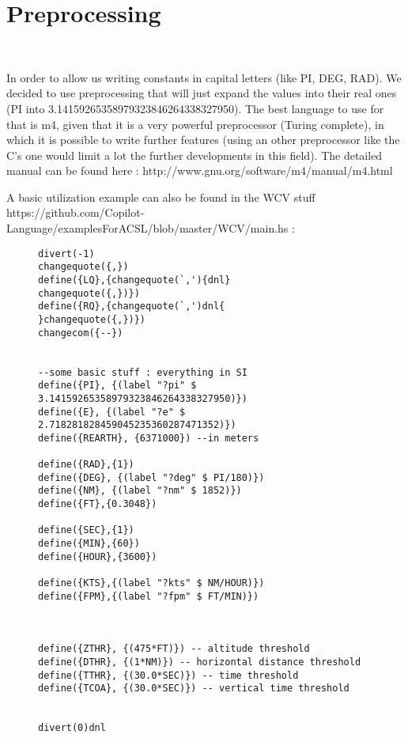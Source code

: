 \section{Preprocessing}~\label{sec:preprocessing}

In order to allow us writing constants in capital letters (like PI, DEG, RAD). We decided to use preprocessing that will just expand the values into their real ones (PI into 3.14159265358979323846264338327950). The best language to use for that is m4, given that it is a very powerful preprocessor (Turing complete), in which it is possible to write further features (using an other preprocessor like the C's one would limit a lot the further developments in this field). The detailed manual can be found here : http://www.gnu.org/software/m4/manual/m4.html


A basic utilization example can also be found in the WCV stuff https://github.com/Copilot-Language/examplesForACSL/blob/master/WCV/main.hs : 

\begin{figure}[!htb]
\begin{lstlisting}
divert(-1)
changequote({,})
define({LQ},{changequote(`,'){dnl}
changequote({,})})
define({RQ},{changequote(`,')dnl{
}changequote({,})})
changecom({--})


--some basic stuff : everything in SI
define({PI}, {(label "?pi" $ 3.14159265358979323846264338327950)})
define({E}, {(label "?e" $ 2.718281828459045235360287471352)})
define({REARTH}, {6371000}) --in meters

define({RAD},{1})
define({DEG}, {(label "?deg" $ PI/180)})
define({NM}, {(label "?nm" $ 1852)})
define({FT},{0.3048})

define({SEC},{1})
define({MIN},{60})
define({HOUR},{3600})

define({KTS},{(label "?kts" $ NM/HOUR)})
define({FPM},{(label "?fpm" $ FT/MIN)})



define({ZTHR}, {(475*FT)}) -- altitude threshold
define({DTHR}, {(1*NM)}) -- horizontal distance threshold
define({TTHR}, {(30.0*SEC)}) -- time threshold
define({TCOA}, {(30.0*SEC)}) -- vertical time threshold


divert(0)dnl
\end{lstlisting}
\end{figure}



